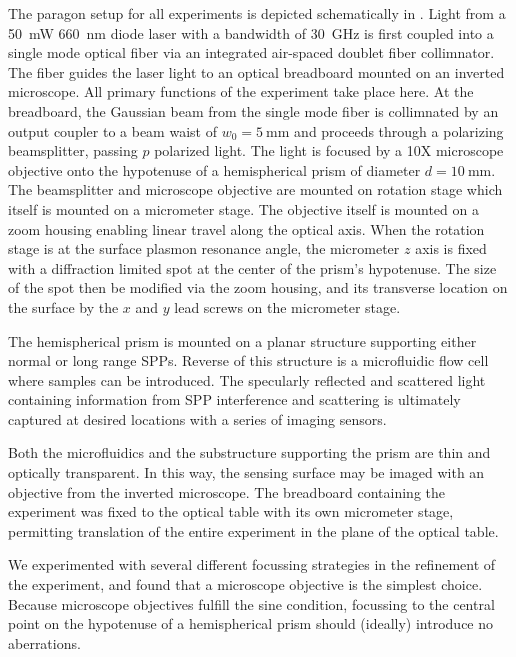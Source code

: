 
The paragon setup for all experiments is depicted schematically in
.  Light from a \SI{50}{\milli\watt}
\SI{660}{\nano\meter} diode laser with a bandwidth of \SI{30}{\giga\hertz}
is first coupled into a single mode optical fiber via an integrated
air-spaced doublet fiber collimnator.  The fiber guides the laser light to
an optical breadboard mounted on an inverted microscope.  All primary
functions of the experiment take place here.  At the breadboard, the
Gaussian beam from the single mode fiber is collimnated by an output
coupler to a beam waist of $w_0=\SI{5}{\milli\meter}$ and proceeds through
a polarizing beamsplitter, passing $p$ polarized light.  The light is
focused by a 10X microscope objective onto the hypotenuse of a
hemispherical prism of diameter $d=\SI{10}{\milli\meter}$.  The
beamsplitter and microscope objective are mounted on rotation stage which
itself is mounted on a micrometer stage.  The objective itself is mounted
on a zoom housing enabling linear travel along the optical axis.  When the
rotation stage is at the surface plasmon resonance angle, the micrometer
$z$ axis is fixed with a diffraction limited spot at the center of the
prism's hypotenuse.  The size of the spot then be modified via the zoom
housing, and its transverse location on the surface by the $x$ and $y$ lead
screws on the micrometer stage.  

The hemispherical prism is mounted on a planar structure supporting either
normal or long range SPPs.  Reverse of this structure is a microfluidic
flow cell where samples can be introduced.  The specularly reflected and
scattered light containing information from SPP interference and scattering
is ultimately captured at desired locations with a series of imaging
sensors.

Both the microfluidics and the substructure supporting the prism are thin and
optically transparent.  In this way, the sensing surface may be imaged with
an objective from the inverted microscope.  The breadboard containing the
experiment was fixed to the optical table with its own micrometer stage,
permitting translation of the entire experiment in the plane of the optical
table.

We experimented with several different focussing strategies in the
refinement of the experiment, and found that a microscope objective is the
simplest choice.  Because microscope objectives fulfill the sine condition,
focussing to the central point on the hypotenuse of a hemispherical prism
should (ideally) introduce no aberrations.

